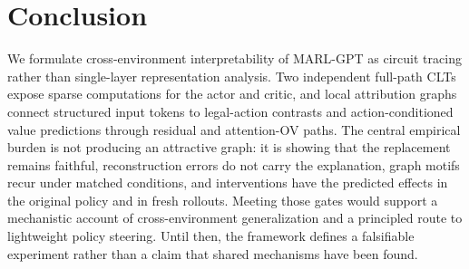 \section{Conclusion}

We formulate cross-environment interpretability of MARL-GPT as circuit tracing rather than single-layer representation analysis. Two independent full-path CLTs expose sparse computations for the actor and critic, and local attribution graphs connect structured input tokens to legal-action contrasts and action-conditioned value predictions through residual and attention-OV paths. The central empirical burden is not producing an attractive graph: it is showing that the replacement remains faithful, reconstruction errors do not carry the explanation, graph motifs recur under matched conditions, and interventions have the predicted effects in the original policy and in fresh rollouts. Meeting those gates would support a mechanistic account of cross-environment generalization and a principled route to lightweight policy steering. Until then, the framework defines a falsifiable experiment rather than a claim that shared mechanisms have been found.
